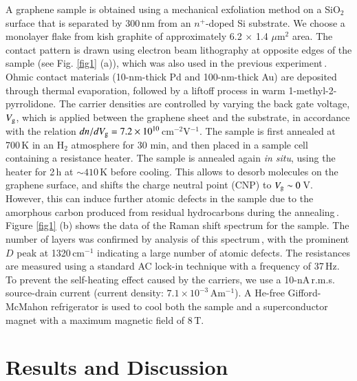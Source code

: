 \documentclass[final,5p,times,twocolumn]{elsarticle}
\begin{document}
A graphene sample is obtained using a mechanical exfoliation method \cite{Novoselov_science} on a SiO$_2$ surface that is separated by 300\,nm from an $n^+$-doped Si substrate.
We choose a monolayer flake from kish graphite of approximately 6.2 $\times$ 1.4 $\mu$m$^2$ area. The contact pattern is drawn using electron beam lithography at opposite edges of the sample (see Fig. \ref{fig1} (a)), which was also used in the previous experiment\,\cite{GrWL}.
Ohmic contact materials (10-nm-thick Pd and 100-nm-thick Au) are deposited through thermal evaporation, followed by a liftoff process in warm 1-methyl-2-pyrrolidone.
The carrier densities are controlled by varying the back gate voltage, $V_{\rm g}$, which is applied between the graphene sheet and the substrate, in accordance with the relation $dn/dV_{\rm g} = 7.2 \times 10^{10}$\,cm$^{-2}$V$^{-1}$.
The sample is first annealed at 700\,K in an H$_2$ atmosphere for 30 min,
and then placed in a sample cell containing a resistance heater.
The sample is annealed again {\it in situ}, using the heater  
for 2\,h at $\sim 410$\,K before cooling.
This allows to desorb molecules on the graphene surface, and shifts the charge neutral point (CNP)  to $V_{\rm g} \sim 0$\,V.
However, this can induce further atomic defects in the sample due to the amorphous carbon produced from residual hydrocarbons during the annealing\,\cite{JinpyoHong}.
Figure \ref{fig1} (b) shows the data of the Raman shift spectrum for the sample.
The number of layers was confirmed by analysis of this spectrum\,\cite{Ferrari200747}, with the prominent $D$ peak at 1320\,cm$^{-1}$ indicating a large number of atomic defects.
The resistances are measured using a standard AC lock-in technique with a frequency of 37\,Hz.
To prevent the self-heating effect caused by the carriers, we use a 10-nA\,r.m.s. source-drain current (current density: $7.1 \times 10^{-3}$\,Am$^{-1}$).
A He-free Gifford-McMahon refrigerator is used to cool both the sample and a superconductor magnet with a maximum magnetic field of 8\,T.

\section{Results and Discussion}
\end{document}
